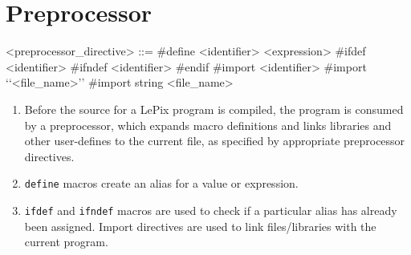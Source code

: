 \section{Preprocessor}
\begin{grammar}
	<preprocessor_directive> ::= \#define <identifier> <expression>
	\alt \#ifdef <identifier>
	\alt \#ifndef <identifier>
	\alt \#endif
	\alt \#import <identifier>
	\alt \#import ‘‘<file_name>’’
	\alt \#import string <file_name>
\end{grammar}
\begin{enumerate}
	\item Before the source for a LePix program is compiled, the program is consumed by a preprocessor, which expands macro definitions and links libraries and other user-defines to the current file, as specified by appropriate preprocessor directives.
	\item \lstinline|define| macros create an alias for a value or expression.
	\item \lstinline|ifdef| and \lstinline|ifndef| macros are used to check if a particular alias has already been assigned. Import directives are used to link files/libraries with the current program.
\end{enumerate}
